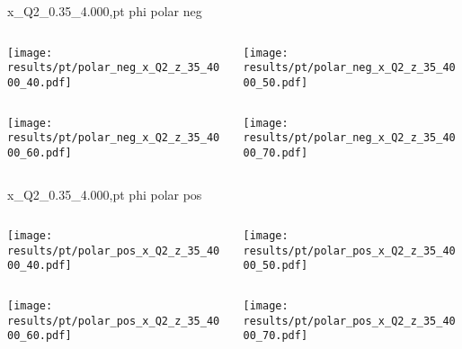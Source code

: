 \begin{frame}{x\_Q2\_0.35\_4.000,pt phi polar neg}
\begin{columns}
\begin{column}[T]{0.5\textwidth}
\texttt{[image: results/pt/polar\_neg\_x\_Q2\_z\_35\_4000\_40.pdf]}
\end{column}
\begin{column}[T]{0.5\textwidth}
\texttt{[image: results/pt/polar\_neg\_x\_Q2\_z\_35\_4000\_50.pdf]}
\end{column}
\end{columns}
\begin{columns}
\begin{column}[T]{0.5\textwidth}
\texttt{[image: results/pt/polar\_neg\_x\_Q2\_z\_35\_4000\_60.pdf]}
\end{column}
\begin{column}[T]{0.5\textwidth}
\texttt{[image: results/pt/polar\_neg\_x\_Q2\_z\_35\_4000\_70.pdf]}
\end{column}
\end{columns}
\end{frame}
\begin{frame}{x\_Q2\_0.35\_4.000,pt phi polar pos}
\begin{columns}
\begin{column}[T]{0.5\textwidth}
\texttt{[image: results/pt/polar\_pos\_x\_Q2\_z\_35\_4000\_40.pdf]}
\end{column}
\begin{column}[T]{0.5\textwidth}
\texttt{[image: results/pt/polar\_pos\_x\_Q2\_z\_35\_4000\_50.pdf]}
\end{column}
\end{columns}
\begin{columns}
\begin{column}[T]{0.5\textwidth}
\texttt{[image: results/pt/polar\_pos\_x\_Q2\_z\_35\_4000\_60.pdf]}
\end{column}
\begin{column}[T]{0.5\textwidth}
\texttt{[image: results/pt/polar\_pos\_x\_Q2\_z\_35\_4000\_70.pdf]}
\end{column}
\end{columns}
\end{frame}
